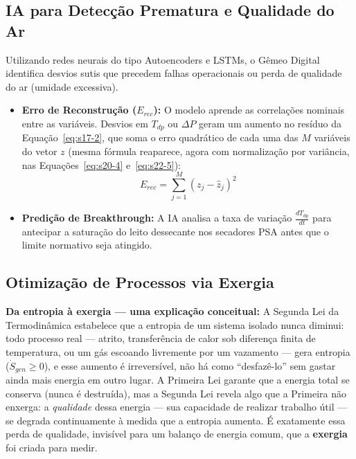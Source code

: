 \documentclass[12pt,a4paper]{article}
\numberwithin{equation}{section}
\numberwithin{table}{section}
\numberwithin{figure}{section}
\begin{document}
\subsection{IA para Detecção Prematura e Qualidade do Ar}

Utilizando redes neurais do tipo Autoencoders e LSTMs, o Gêmeo Digital identifica desvios sutis que precedem falhas operacionais ou perda de qualidade do ar (umidade excessiva).

\begin{itemize}
	\item \textbf{Erro de Reconstrução ($E_{rec}$):}
	O modelo aprende as correlações nominais entre as variáveis. Desvios em $T_{dp}$ ou $\Delta P$ geram um aumento no resíduo da Equação~\eqref{eq:s17-2}, que soma o erro quadrático de cada uma das $M$ variáveis do vetor $z$ (mesma fórmula reaparece, agora com normalização por variância, nas Equações~\eqref{eq:s20-4} e~\eqref{eq:s22-5}):
	\begin{equation}\label{eq:s17-2}
E_{rec} = \sum_{j=1}^{M} (z_j - \hat{z}_j)^2
\end{equation}
	
	\item \textbf{Predição de Breakthrough:} A IA analisa a taxa de variação $\frac{dT_{dp}}{dt}$ para antecipar a saturação do leito dessecante nos secadores PSA antes que o limite normativo seja atingido.
\end{itemize}

\subsection{Otimização de Processos via Exergia}

\textbf{Da entropia à exergia — uma explicação conceitual:} A Segunda Lei da Termodinâmica estabelece que a entropia de um sistema isolado nunca diminui: todo processo real — atrito, transferência de calor sob diferença finita de temperatura, ou um gás escoando livremente por um vazamento — gera entropia ($\dot{S}_{gen} \ge 0$), e esse aumento é irreversível, não há como ``desfazê-lo'' sem gastar ainda mais energia em outro lugar. A Primeira Lei garante que a energia total se conserva (nunca é destruída), mas a Segunda Lei revela algo que a Primeira não enxerga: a \textit{qualidade} dessa energia — sua capacidade de realizar trabalho útil — se degrada continuamente à medida que a entropia aumenta. É exatamente essa perda de qualidade, invisível para um balanço de energia comum, que a \textbf{exergia} foi criada para medir.
\end{document}
